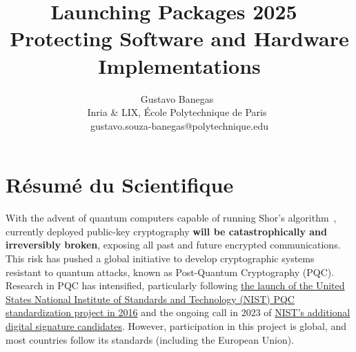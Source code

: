 \documentclass[11pt, a4paper]{article}
\begin{document}
\title{Launching Packages 2025~\\Protecting Software and  Hardware Implementations}
\author{Gustavo Banegas~\\
 Inria \& LIX, École Polytechnique de Paris~\\
 gustavo.souza-banegas@polytechnique.edu}
\date{}
\maketitle

\section{Résumé du Scientifique}

With the advent of quantum computers capable of running Shor's 
algorithm~\cite{365700}, currently deployed public-key 
cryptography \textbf{will be catastrophically and irreversibly broken}, 
exposing all past and future encrypted communications. 
This risk has pushed a global initiative to develop cryptographic 
systems resistant to quantum attacks, known as Post-Quantum Cryptography (PQC). 
Research in PQC has intensified, particularly following 
\href{https://csrc.nist.gov/projects/post-quantum-cryptography/post-quantum-cryptography-standardization/call-for-proposals}
{the launch of the United States National Institute of Standards and Technology (NIST) PQC standardization project in 2016}
and the ongoing call in 2023 of \href{https://www.nist.gov/news-events/news/2023/07/nist-announces-additional-digital-signature-candidates-pqc-standardization}
{NIST's additional digital signature candidates}.
However, participation in this project is global, and most countries follow its standards (including 
the European Union).
\end{document}
